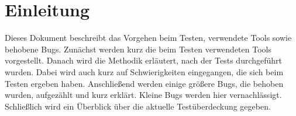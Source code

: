 \part{Einleitung}

Dieses Dokument beschreibt das Vorgehen beim Testen, verwendete Tools sowie behobene Bugs.
Zunächst werden kurz die beim Testen verwendeten Tools vorgestellt.
Danach wird die Methodik erläutert, nach der Tests durchgeführt wurden. Dabei wird auch kurz auf Schwierigkeiten eingegangen, die sich beim Testen ergeben haben.
Anschließend werden einige größere Bugs, die behoben wurden, aufgezählt und kurz erklärt. 
Kleine Bugs werden hier vernachlässigt.
Schließlich wird ein Überblick über die aktuelle Testüberdeckung gegeben.